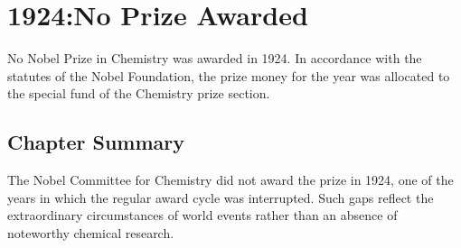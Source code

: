 \chapter{1924:No Prize Awarded}
\label{chap:chemistry1924}

No Nobel Prize in Chemistry was awarded in 1924. In accordance with the statutes of the Nobel Foundation, the prize money for the year was allocated to the special fund of the Chemistry prize section.

\section*{Chapter Summary}

The Nobel Committee for Chemistry did not award the prize in 1924, one of the years in which the regular award cycle was interrupted. Such gaps reflect the extraordinary circumstances of world events rather than an absence of noteworthy chemical research.
